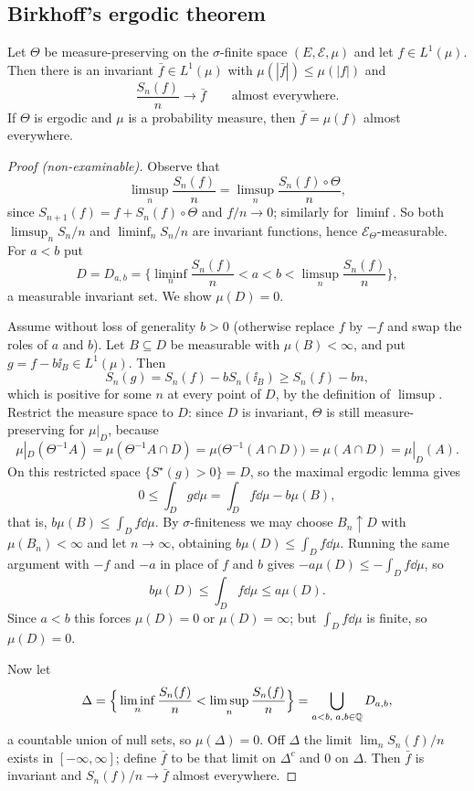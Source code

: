 \documentclass[a4paper]{scrartcl}
\newcommand{\cE}{\mathcal{E}}
\newcommand{\ind}{\ii}
\begin{document}
\subsection{Birkhoff's ergodic theorem}

\begin{theorem}[Birkhoff]\label{thm:birkhoff}
	Let $\Theta$ be measure-preserving on the $\sigma$-finite space $(E,\cE,\mu)$ and let $f \in L^1(\mu)$. Then there is an invariant $\bar f \in L^1(\mu)$ with $\mu(|\bar f|)\leq\mu(|f|)$ and
	$$
	\frac{S_n(f)}{n}\longrightarrow\bar f \qquad \text{almost everywhere.}
	$$
	If $\Theta$ is ergodic and $\mu$ is a probability measure, then $\bar f = \mu(f)$ almost everywhere.
\end{theorem}
\begin{proof}[Proof (non-examinable)]
	Observe that
	$$
	\limsup_n \frac{S_n(f)}{n} = \limsup_n \frac{S_n(f)\circ\Theta}{n},
	$$
	since $S_{n+1}(f) = f + S_n(f)\circ\Theta$ and $f/n \to 0$; similarly for $\liminf$. So both $\limsup_n S_n/n$ and $\liminf_n S_n/n$ are invariant functions, hence $\cE_\Theta$-measurable. For $a<b$ put
	$$
	D = D_{a,b}=\Big\{\liminf_n \frac{S_n(f)}{n}<a<b<\limsup_n\frac{S_n(f)}{n}\Big\},
	$$
	a measurable invariant set. We show $\mu(D)=0$.

	Assume without loss of generality $b>0$ (otherwise replace $f$ by $-f$ and swap the roles of $a$ and $b$). Let $B \subseteq D$ be measurable with $\mu(B)<\infty$, and put $g = f - b\ind_B \in L^1(\mu)$. Then
	$$
	S_n(g) = S_n(f)-bS_n(\ind_B) \geq S_n(f)-bn,
	$$
	which is positive for some $n$ at every point of $D$, by the definition of $\limsup$. Restrict the measure space to $D$: since $D$ is invariant, $\Theta$ is still measure-preserving for $\mu|_D$, because
	$$
	\mu|_D(\Theta^{-1}A)=\mu(\Theta^{-1}A \cap D) = \mu\big(\Theta^{-1}(A\cap D)\big)=\mu(A\cap D)=\mu|_D(A).
	$$
	On this restricted space $\{S^\star(g)>0\}=D$, so the maximal ergodic lemma gives
	$$
	0 \leq \int_D g\dd\mu = \int_D f\dd\mu - b\mu(B),
	$$
	that is, $b\mu(B)\leq \int_D f\dd\mu$. By $\sigma$-finiteness we may choose $B_n \uparrow D$ with $\mu(B_n)<\infty$ and let $n \to\infty$, obtaining $b\mu(D)\leq\int_Df\dd\mu$. Running the same argument with $-f$ and $-a$ in place of $f$ and $b$ gives $-a\mu(D)\leq -\int_Df\dd\mu$, so
	$$
	b\mu(D)\leq\int_D f\dd\mu\leq a\mu(D).
	$$
	Since $a<b$ this forces $\mu(D)=0$ or $\mu(D)=\infty$; but $\int_D f\dd\mu$ is finite, so $\mu(D)=0$.

	Now let
	$$
	\Delta = \Big\{\liminf_n\frac{S_n(f)}{n}<\limsup_n\frac{S_n(f)}{n}\Big\}=\bigcup_{a<b,\; a,b\in\mathbb{Q}}D_{a,b},
	$$
	a countable union of null sets, so $\mu(\Delta)=0$. Off $\Delta$ the limit $\lim_n S_n(f)/n$ exists in $[-\infty,\infty]$; define $\bar f$ to be that limit on $\Delta^c$ and $0$ on $\Delta$. Then $\bar f$ is invariant and $S_n(f)/n\to\bar f$ almost everywhere.


\end{proof}
\end{document}
